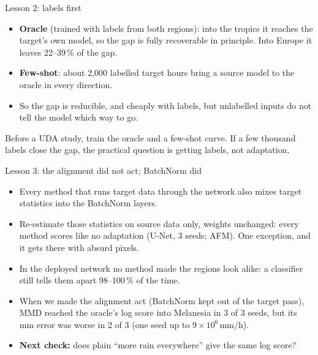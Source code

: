 \documentclass[11pt,aspectratio=169,xcolor=table]{beamer}
\newcommand{\take}[1]{\vfill\begin{block}{}#1\end{block}}
\begin{document}
\begin{frame}{Lesson 2: labels first}
\begin{itemize}
  \item \textbf{Oracle} (trained with labels from both regions): into the
        tropics it reaches the target's own model, so the gap is fully
        recoverable in principle. Into Europe it leaves 22--39\,\% of the
        gap.
  \item \textbf{Few-shot}: about 2{,}000 labelled target hours bring a
        source model to the oracle in every direction.
  \item So the gap is reducible, and cheaply with labels, but unlabelled
        inputs do not tell the model which way to go.
\end{itemize}
\take{Before a UDA study, train the oracle and a few-shot curve. If a few
thousand labels close the gap, the practical question is getting labels,
not adaptation.}
\end{frame}

\begin{frame}{Lesson 3: the alignment did not act; BatchNorm did}
\begin{itemize}
  \item Every method that runs target data through the network also mixes
        target statistics into the BatchNorm layers.
  \item Re-estimate those statistics on source data only, weights
        unchanged: every method scores like no adaptation (U-Net, 3 seeds;
        AFM). One exception, and it gets there with absurd pixels.
  \item In the deployed network no method made the regions look alike: a
        classifier still tells them apart 98--100\,\% of the time.
  \item When we made the alignment act (BatchNorm kept out of the target
        pass), MMD reached the oracle's log score into Melanesia in 3 of 3
        seeds, but its mm error was worse in 2 of 3 (one seed up to
        $9\times10^{6}$\,mm/h).
  \item \textbf{Next check:} does plain ``more rain everywhere'' give the
        same log score?
\end{itemize}
\end{frame}
\end{document}
